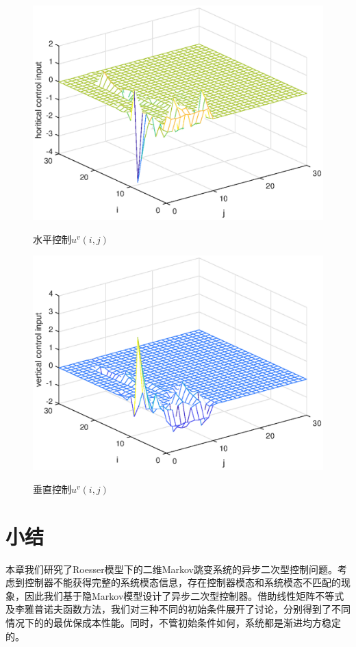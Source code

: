 	\begin{figure}[!htb]
		\centering\includegraphics[scale=0.6]{./figures/qc/simulation/hU.eps}\\ 
		\caption{水平控制$u^{v}(i,j)$}
		\label{figqcuh}
	\end{figure}
	
	\begin{figure}[!htb]
		\centering\includegraphics[scale=0.6]{./figures/qc/simulation/vH.eps}\\ 
		\caption{垂直控制$u^{v}(i,j)$}
		\label{figqcuv}
	\end{figure}

\section{小结} \label{conclusion} 	
	本章我们研究了Roesser模型下的二维Markov跳变系统的异步二次型控制问题。考虑到控制器不能获得完整的系统模态信息，存在控制器模态和系统模态不匹配的现象，因此我们基于隐Markov模型设计了异步二次型控制器。借助线性矩阵不等式及李雅普诺夫函数方法，我们对三种不同的初始条件展开了讨论，分别得到了不同情况下的的最优保成本性能。同时，不管初始条件如何，系统都是渐进均方稳定的。
	
	